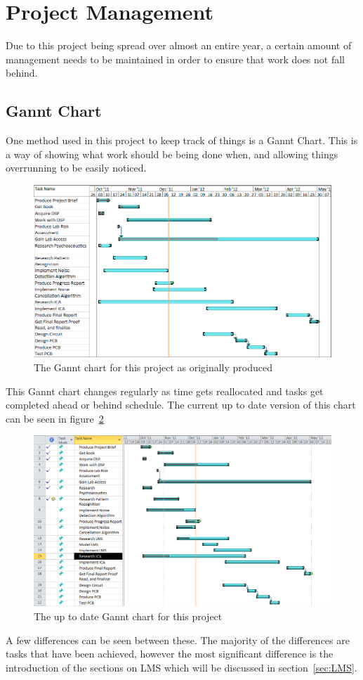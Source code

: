 \section{Project Management}
Due to this project being spread over almost an entire year, a certain amount of management needs to be maintained in order to ensure that work does not fall behind.

\subsection{Gannt Chart}
One method used in this project to keep track of things is a Gannt Chart.
This is a way of showing what work should be being done when, and allowing things overrunning to be easily noticed.

\begin{figure}[h]
	\centering
	\includegraphics[width=\textwidth]{./img/ganntori.png}
	\caption{The Gannt chart for this project as originally produced}
	\label{fig:gannt}
\end{figure}
\noindent
This Gannt chart changes regularly as time gets reallocated and tasks get completed ahead or behind schedule.
The current up to date version of this chart can be seen in figure~\ref{fig:newgannt}

\begin{figure}[H]
	\centering
	\includegraphics[width=\textwidth]{./img/ganntnew.png}
	\caption{The up to date Gannt chart for this project}
	\label{fig:newgannt}
\end{figure}
\noindent
A few differences can be seen between these.
The majority of the differences are tasks that have been achieved, however the most significant difference is the introduction of the sections on LMS which will be discussed in section~\ref{sec:LMS}.

